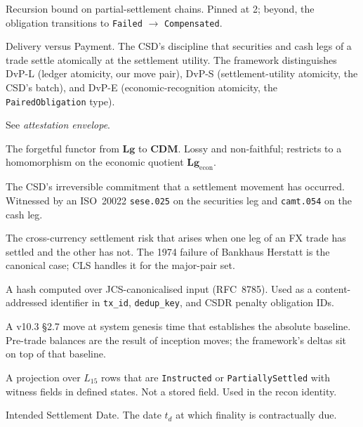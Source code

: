 \documentclass[11pt,a4paper]{article}
\begin{document}
\begin{description}[style=nextline,leftmargin=1.5em]
\item[$D_{\max}$] Recursion bound on partial-settlement chains. Pinned at 2; beyond, the obligation transitions to \texttt{Failed} $\to$ \texttt{Compensated}.

\item[DvP] Delivery versus Payment. The CSD's discipline that securities and cash legs of a trade settle atomically at the settlement utility. The framework distinguishes DvP-L (ledger atomicity, our move pair), DvP-S (settlement-utility atomicity, the CSD's batch), and DvP-E (economic-recognition atomicity, the \texttt{PairedObligation} type).

\item[Envelope] See \emph{attestation envelope}.

\item[$F$] The forgetful functor from $\mathbf{Lg}$ to $\mathbf{CDM}$. Lossy and non-faithful; restricts to a homomorphism on the economic quotient $\mathbf{Lg}_{\mathrm{econ}}$.

\item[Finality] The CSD's irreversible commitment that a settlement movement has occurred. Witnessed by an ISO~20022 \texttt{sese.025} on the securities leg and \texttt{camt.054} on the cash leg.

\item[Herstatt risk] The cross-currency settlement risk that arises when one leg of an FX trade has settled and the other has not. The 1974 failure of Bankhaus Herstatt is the canonical case; CLS handles it for the major-pair set.

\item[\texttt{hash\_jcs}] A hash computed over JCS-canonicalised input (RFC~8785). Used as a content-addressed identifier in \texttt{tx\_id}, \texttt{dedup\_key}, and CSDR penalty obligation IDs.

\item[Inception move] A v10.3 \S2.7 move at system genesis time that establishes the absolute baseline. Pre-trade balances are the result of inception moves; the framework's deltas sit on top of that baseline.

\item[Inflight] A projection over $L_{15}$ rows that are \texttt{Instructed} or \texttt{PartiallySettled} with witness fields in defined states. Not a stored field. Used in the recon identity.

\item[ISD] Intended Settlement Date. The date $t_d$ at which finality is contractually due.


\end{description}
\end{document}
